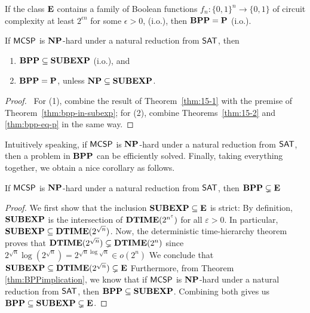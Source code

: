\documentclass[11pt]{article}
\begin{document}
\begin{theorem}
  \label{thm:bpp-eq-p}
	If the class $\mathbf{E}$ contains a family of Boolean functions $f_n: \{0, 1\}^n \rightarrow \{0, 1\}$ of circuit complexity at least $2^{\epsilon n}$ for some $\epsilon > 0$, (i.o.), then $\mathbf{BPP} = \mathbf{P}$ (i.o.).
\end{theorem}

\begin{theorem}[\cite{10.1145/335305.335314}]
	\label{thm:BPPimplication}
	If $\mathsf{MCSP}$ is $\mathbf{NP}$-hard under a natural reduction from $\mathsf{SAT}$, then
	\begin{enumerate} [1.]
		\item $\mathbf{BPP} \subseteq \mathbf{SUBEXP}$ (i.o.), and
		\item $\mathbf{BPP} = \mathbf{P}$, unless $\mathbf{NP} \subseteq \mathbf{SUBEXP}$.
	\end{enumerate}
\end{theorem}

\begin{proof} \
  For (1), combine the result of Theorem~\ref{thm:15-1} with the premise of
  Theorem~\ref{thm:bpp-in-subexp};
  for (2), combine Theorems~\ref{thm:15-2} and \ref{thm:bpp-eq-p} in the same
  way.
\end{proof}

Intuitively speaking, if $\mathsf{MCSP}$ is $\mathbf{NP}$-hard under a natural reduction from $\mathsf{SAT}$, then a problem in $\mathbf{BPP}$ can be efficiently solved. Finally, taking everything together, we obtain a nice corollary as follows.

\begin{corollary}
	If $\mathsf{MCSP}$ is $\mathbf{NP}$-hard under a natural reduction from $\mathsf{SAT}$, then $\mathbf{BPP} \subsetneq \mathbf{E}$
\end{corollary}

\begin{proof}
  We first show that the inclusion $\mathbf{SUBEXP} \subseteq \mathbf{E}$ is
  strict:
  By definition, $\mathbf{SUBEXP}$ is the intersection of
  $\mathbf{DTIME}(2^{n^\varepsilon})$ for all $\varepsilon > 0$.
  In particular, $\mathbf{SUBEXP} \subseteq \mathbf{DTIME}(2^{\sqrt n})$.
  Now, the deterministic time-hierarchy theorem proves that
  $\mathbf{DTIME}(2^{\sqrt n}) \subsetneq \mathbf{DTIME}(2^{n})$ since
  $2^{\sqrt n} \log(2^{\sqrt n}) = 2^{\sqrt n \log \sqrt n}
   \in o(2^n)$
  We conclude that
  $\mathbf{SUBEXP} \subseteq \mathbf{DTIME}(2^{\sqrt n}) \subsetneq \mathbf{E}$
  Furthermore, from Theorem \ref{thm:BPPimplication}, we know that if
  $\mathsf{MCSP}$ is
  $\mathbf{NP}$-hard under a natural reduction from $\mathsf{SAT}$, then
  $\mathbf{BPP} \subseteq \mathbf{SUBEXP}$.
  Combining both gives us
  $\mathbf{BPP} \subseteq \mathbf{SUBEXP} \subsetneq \mathbf{E}$.
\end{proof}
\end{document}
